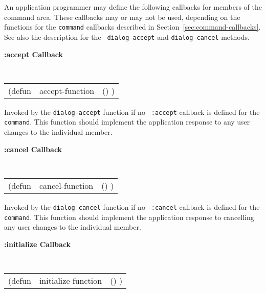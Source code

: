 An application programmer may define the following callbacks for
members of the command area. These callbacks may or may not be used, depending on
the 
functions for the {\tt command} callbacks described in
Section~\ref{sec:command-callbacks}. See also the description for the {\tt
dialog-accept} and {\tt dialog-cancel} methods. 

{\samepage
{\large {\bf :accept \hfill Callback}} 
\begin{flushright} 
\parbox[t]{6.125in}{
\tt
\begin{tabular}{lll}
\raggedright
(defun & accept-function & () )
\end{tabular}
\rm

}\end{flushright}}

\begin{flushright} \parbox[t]{6.125in}{
Invoked by the {\tt dialog-accept} function if no {\tt
:accept} callback is defined for the {\tt command}.
This function should implement the application response to any user changes to
the individual member.
}\end{flushright}

{\samepage
{\large {\bf :cancel \hfill Callback}} 
\begin{flushright} 
\parbox[t]{6.125in}{
\tt
\begin{tabular}{lll}
\raggedright
(defun & cancel-function & () )
\end{tabular}
\rm

}\end{flushright}}

\begin{flushright} \parbox[t]{6.125in}{
Invoked by the {\tt dialog-cancel} function if no {\tt
:cancel} callback is defined for the {\tt command}.
This function should implement the application response to cancelling any user
changes to the individual member.

}\end{flushright}

{\samepage
{\large {\bf :initialize \hfill Callback}} 
\begin{flushright} 
\parbox[t]{6.125in}{
\tt
\begin{tabular}{lll}
\raggedright
(defun & initialize-function & () )
\end{tabular}
\rm

}\end{flushright}}

